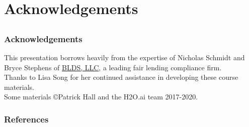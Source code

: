 \documentclass[11pt,aspectratio=169,hyperref={colorlinks}]{beamer}
\begin{document}
	\section{Acknowledgements}

	\subsection*{}
	
	\begin{frame}
	
		\frametitle{Acknowledgements}
		
		This presentation borrows heavily from the expertise of Nicholas Schmidt and Bryce Stephens of \href{https://www.bldsllc.com/}{BLDS, LLC}, a leading fair lending compliance firm.\\
		\vspace{10pt}		
		Thanks to Lisa Song for her continued assistance in developing these course materials.\\
		\vspace{10pt}
		Some materials \copyright\hspace{1pt}Patrick Hall and the H2O.ai team 2017-2020.  

	\end{frame}	
	

	\begin{frame}[t, allowframebreaks]
	
		\frametitle{References}
		\printbibliography
		
	\end{frame}
\end{document}
